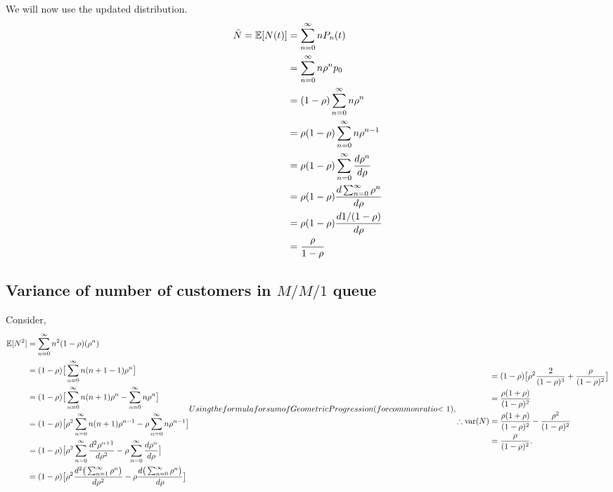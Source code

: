\documentclass[11pt, a4paper]{report}
\begin{document}
We will now use the updated distribution.
\begin{subequations}
    \begin{align}
        \bar{N} = {\mathbb{E}}[N(t)] &= \sum_{n=0}^{\infty} n P_n(t) \\
        &= \sum_{n=0}^{\infty} n \rho^n p_0 \\
        &= (1 - \rho) \sum_{n=0}^{\infty} n \rho^n \\
        &= \rho (1 - \rho) \sum_{n=0}^{\infty} n \rho^{n-1}\\
        &= \rho (1 - \rho) \sum_{n=0}^{\infty} \frac{d \rho^n}{d \rho} \\
        &= \rho (1 - \rho) \frac{d\sum_{n=0}^{\infty}  \rho^n}{d \rho} \\
        &= \rho(1 - \rho) \frac{d 1/(1-\rho)}{d \rho} \\
        &= \frac{\rho}{1-\rho}
    \end{align}
    \label{eq:avgMM1}
\end{subequations}

\subsection{Variance of number of customers in $M/M/1$ queue}
Consider,
\begin{subequations}
    \begin{align}
        \ExpVal[N^2] &= \sum_{n=0}^{\infty} n^2 (1 - \rho)(\rho^n) \\
        &= (1 - \rho) \big[\sum_{n=0}^{\infty}n(n+1-1)\rho^n \big] \\
        &= (1 - \rho) \big[\sum_{n=0}^{\infty} n(n+1)\rho^n - \sum_{n=0}^{\infty}n\rho^n\big] \\
        &= (1 - \rho) \big[\rho^2 \sum_{n=0}^{\infty} n(n+1)\rho^{n-1} - \rho\sum_{n=0}^{\infty}n\rho^{n-1}\big] \\
        &= (1 - \rho) \big[\rho^2 \sum_{n=0}^{\infty} \frac{d^2\rho^{n+1}}{d\rho^2} - \rho\sum_{n=0}^{\infty}\frac{d\rho^{n}}{d \rho}\big] \\
        &= (1 - \rho) \big[\rho^2 \frac{d^2 \big(\sum_{n=1}^{\infty} \rho^n \big)}{d\rho^2} - \rho \frac{d \big(\sum_{n=0}^{\infty} \rho^n \big)}{d\rho}\big]
    \end{align}
    Using the formula for sum of Geometric Progression (for common ratio $< 1$),
    \begin{align}
        &= (1 - \rho) \big[ \rho^2 \frac{2}{(1-\rho)^3} + \frac{\rho}{(1 - \rho)^ 2}\big] \\
        &= \frac{\rho(1 + \rho)}{(1 - \rho)^ 2} \\
        \therefore \text{var}(N) &= \frac{\rho(1 + \rho)}{(1 - \rho)^ 2} - \frac{\rho^2}{(1 - \rho)^2} \\
        &= \frac{\rho}{(1 - \rho)^2}.
    \end{align} 
    \label{fig:varMM1}
\end{subequations}
\end{document}

